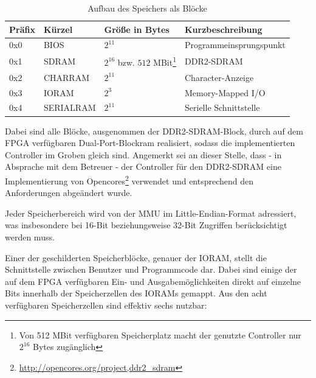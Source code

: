 \begin{table}[H]
	\begin{center}
	\label{tab:ramlayout}
	\begin{tabular}{| l | l | l | l |}
		\hline
		Pr\"afix & K\"urzel & Gr\"o\ss{}e in Bytes & Kurzbeschreibung \\ \hline
		0x0 & BIOS & $2^{11}$ & Programmeinsprungspunkt \\ \hline
		0x1 & SDRAM & $2^{16}$ bzw. $512$ MBit\footnote{Von 512 MBit verf\"ugbaren Speicherplatz macht der genutzte Controller nur $2^{16}$ Bytes zug\"anglich} & DDR2-SDRAM \\ \hline
		0x2 & CHARRAM & $2^{11}$ & Character-Anzeige \\ \hline
		0x3 & IORAM & $2^{3}$ & Memory-Mapped I/O \\ \hline
		0x4 & SERIALRAM & $2^{11}$ & Serielle Schnittstelle \\ \hline
	\end{tabular}
	\end{center}
	\caption{Aufbau des Speichers als Bl\"ocke}
\end{table}

Dabei sind alle Bl\"ocke, ausgenommen der DDR2-SDRAM-Block, durch auf dem FPGA ver\-f\"ug\-baren Dual-Port-Block\-ram realisiert, sodass die implementierten Controller im Groben gleich sind. Angemerkt sei an dieser Stelle, dass - in Absprache mit dem Betreuer - der Controller f\"ur den DDR2-SDRAM eine Implementierung von Opencores\footnote{\url{http://opencores.org/project,ddr2_sdram}} verwendet und entsprechend den Anforderungen abge\"andert wurde.

Jeder Speicherbereich wird von der MMU im Little-Endian-Format adressiert, was insbesondere bei 16-Bit beziehungsweise 32-Bit Zugriffen ber\"ucksichtigt werden muss.

\label{sec:mmuio}
Einer der geschilderten Speicherbl\"ocke, genauer der IORAM, stellt die Schnittstelle zwischen Benutzer und Programmcode dar. Dabei sind einige der auf dem FPGA verf\"ugbaren Ein- und Ausgabem\"oglichkeiten direkt auf einzelne Bits innerhalb der Speicherzellen des IORAMs gemappt. Aus den acht verf\"ugbaren Speicherzellen sind effektiv sechs nutzbar:

